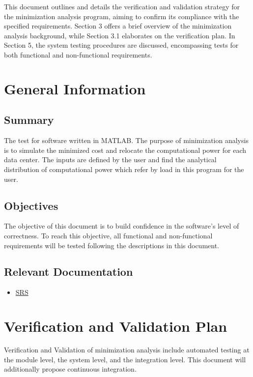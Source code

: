 \documentclass[12pt, titlepage]{article}
\begin{document}
This document outlines and details the verification and validation strategy for the minimization analysis program, aiming to confirm its compliance with the specified requirements. Section 3 offers a brief overview of the minimization analysis background, while Section 3.1 elaborates on the verification plan. In Section 5, the system testing procedures are discussed, encompassing tests for both functional and non-functional requirements.
\newpage

\section{General Information}
\label{GeneralInfo}

\subsection{Summary}

The test for software written in MATLAB. The purpose of minimization analysis is to simulate the minimized cost and relocate the computational power for each data center. The inputs are defined by the user and find the analytical distribution of computational power which refer by load in this program for the user.

\subsection{Objectives}

The objective of this document is to build confidence in the software's level of correctness. To reach this objective, all functional and non-functional requirements will be tested following the descriptions in this document.

\subsection{Relevant Documentation}

\begin{itemize}
	\item 
	\href{https://github.com/XingzhiMac/CAS741-Proj/blob/master/docs/SRS/SRS.pdf}
	{SRS} 
\end{itemize}

\section{Verification and Validation Plan}\label{plan}
Verification and Validation of minimization analysis include automated testing at the module level, the system level, and the integration level. This document will additionally propose continuous integration.	
\end{document}
